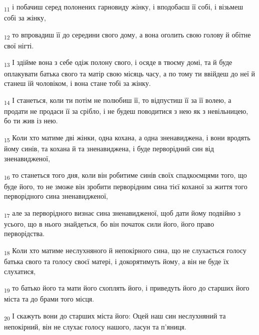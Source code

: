 \begin{tcolorbox}
\textsubscript{11} і побачиш серед полонених гарновиду жінку, і вподобаєш її собі, і візьмеш собі за жінку,
\end{tcolorbox}
\begin{tcolorbox}
\textsubscript{12} то впровадиш її до середини свого дому, а вона оголить свою голову й обітне свої нігті.
\end{tcolorbox}
\begin{tcolorbox}
\textsubscript{13} І здійме вона з себе одіж полону свого, і осяде в твоєму домі, та й буде оплакувати батька свого та матір свою місяць часу, а по тому ти ввійдеш до неї й станеш їй чоловіком, і вона стане тобі за жінку.
\end{tcolorbox}
\begin{tcolorbox}
\textsubscript{14} І станеться, коли ти потім не полюбиш її, то відпустиш її за її волею, а продати не продаси її за срібло, і не будеш поводитися з нею як з невільницею, бо ти жив із нею.
\end{tcolorbox}
\begin{tcolorbox}
\textsubscript{15} Коли хто матиме дві жінки, одна кохана, а одна зненавиджена, і вони вродять йому синів, та кохана й та зненавиджена, і буде перворідний син від зненавидженої,
\end{tcolorbox}
\begin{tcolorbox}
\textsubscript{16} то станеться того дня, коли він робитиме синів своїх спадкоємцями того, що буде його, то не зможе він зробити перворідним сина тієї коханої за життя того перворідного сина зненавидженої,
\end{tcolorbox}
\begin{tcolorbox}
\textsubscript{17} але за перворідного визнає сина зненавидженої, щоб дати йому подвійно з усього, що в нього знайдеться, бо він початок сили його, його право перворідства.
\end{tcolorbox}
\begin{tcolorbox}
\textsubscript{18} Коли хто матиме неслухняного й непокірного сина, що не слухається голосу батька свого та голосу своєї матері, і докорятимуть йому, а він не буде їх слухатися,
\end{tcolorbox}
\begin{tcolorbox}
\textsubscript{19} то батько його та мати його схоплять його, і приведуть його до старших його міста та до брами того місця.
\end{tcolorbox}
\begin{tcolorbox}
\textsubscript{20} І скажуть вони до старших міста його: Оцей наш син неслухняний та непокірний, він не слухає голосу нашого, ласун та п'яниця.
\end{tcolorbox}
